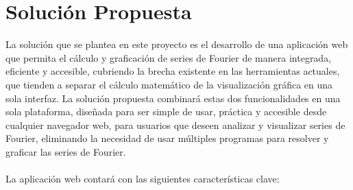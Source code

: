 \section{Solución Propuesta}
La solución que se plantea en este proyecto es el desarrollo de una aplicación web que permita el cálculo y graficación de series de Fourier de manera integrada, eficiente y accesible, cubriendo la brecha existente en las herramientas actuales, que tienden a separar el cálculo matemático de la visualización gráfica en una sola interfaz. La solución propuesta combinará estas dos funcionalidades en una sola plataforma, diseñada para ser simple de usar, práctica y accesible desde cualquier navegador web, para usuarios que deseen analizar y visualizar series de Fourier, eliminando la necesidad de usar múltiples programas para resolver y graficar las series de Fourier. \\\\
La aplicación web contará con las siguientes características clave:
